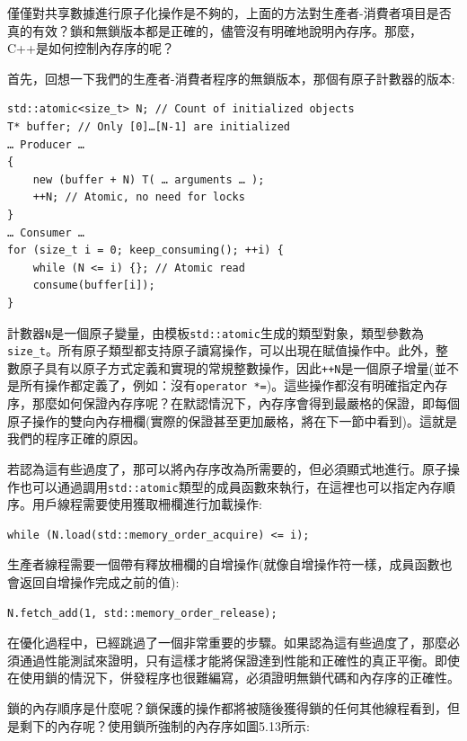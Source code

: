 僅僅對共享數據進行原子化操作是不夠的，上面的方法對生產者-消費者項目是否真的有效？鎖和無鎖版本都是正確的，儘管沒有明確地說明內存序。那麼，C++是如何控制內存序的呢？


首先，回想一下我們的生產者-消費者程序的無鎖版本，那個有原子計數器的版本:

\begin{lstlisting}[style=styleCXX]
std::atomic<size_t> N; // Count of initialized objects
T* buffer; // Only [0]…[N-1] are initialized
… Producer …
{
	new (buffer + N) T( … arguments … );
	++N; // Atomic, no need for locks
}
… Consumer …
for (size_t i = 0; keep_consuming(); ++i) {
	while (N <= i) {}; // Atomic read
	consume(buffer[i]);
}
\end{lstlisting}

計數器\texttt{N}是一個原子變量，由模板\texttt{std::atomic}生成的類型對象，類型參數為\texttt{size\_t}。所有原子類型都支持原子讀寫操作，可以出現在賦值操作中。此外，整數原子具有以原子方式定義和實現的常規整數操作，因此\texttt{++N}是一個原子增量(並不是所有操作都定義了，例如：沒有\texttt{operator *=})。這些操作都沒有明確指定內存序，那麼如何保證內存序呢？在默認情況下，內存序會得到最嚴格的保證，即每個原子操作的雙向內存柵欄(實際的保證甚至更加嚴格，將在下一節中看到)。這就是我們的程序正確的原因。

若認為這有些過度了，那可以將內存序改為所需要的，但必須顯式地進行。原子操作也可以通過調用\texttt{std::atomic}類型的成員函數來執行，在這裡也可以指定內存順序。用戶線程需要使用獲取柵欄進行加載操作:

\begin{lstlisting}[style=styleCXX]
while (N.load(std::memory_order_acquire) <= i);
\end{lstlisting}

生產者線程需要一個帶有釋放柵欄的自增操作(就像自增操作符一樣，成員函數也會返回自增操作完成之前的值):

\begin{lstlisting}[style=styleCXX]
N.fetch_add(1, std::memory_order_release);
\end{lstlisting}

在優化過程中，已經跳過了一個非常重要的步驟。如果認為這有些過度了，那麼必須通過性能測試來證明，只有這樣才能將保證達到性能和正確性的真正平衡。即使在使用鎖的情況下，併發程序也很難編寫，必須證明無鎖代碼和內存序的正確性。

鎖的內存順序是什麼呢？鎖保護的操作都將被隨後獲得鎖的任何其他線程看到，但是剩下的內存呢？使用鎖所強制的內存序如圖5.13所示:

